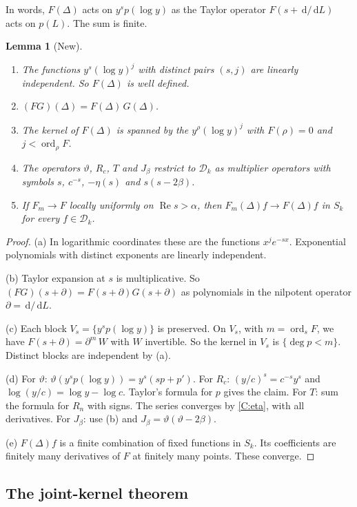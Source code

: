 \documentclass[12pt,letterpaper]{article}
\newtheorem{lemma}[theorem]{Lemma}
\theoremstyle{definition}
\theoremstyle{remark}
\newcommand{\Ree}{\operatorname{Re}}
\newcommand{\dd}{\,\mathrm{d}}
\newcommand{\Dk}{\mathcal{D}_k}
\newcommand{\ord}{\operatorname{ord}}
\newcommand{\yD}{\vartheta}
\begin{document}
In words, $F(\Delta)$ acts on $y^s p(\log y)$ as the Taylor operator
$F(s+\dd/\dd L)$ acts on $p(L)$. The sum is finite.

\begin{lemma}[New]\label{lem:multiplier}
\begin{enumerate}[label=(\alph*)]
\item The functions $y^s(\log y)^j$ with distinct pairs $(s,j)$ are
  linearly independent. So $F(\Delta)$ is well defined.
\item $(FG)(\Delta)=F(\Delta)\,G(\Delta)$.
\item The kernel of $F(\Delta)$ is spanned by the $y^\rho(\log y)^j$ with
  $F(\rho)=0$ and $j<\ord_\rho F$.
\item The operators $\yD$, $R_c$, $T$ and $J_\beta$ restrict to $\Dk$ as
  multiplier operators with symbols $s$, $c^{-s}$, $-\eta(s)$ and
  $s(s-2\beta)$.
\item If $F_m\to F$ locally uniformly on $\Ree s>\alpha$, then
  $F_m(\Delta)f\to F(\Delta)f$ in $S_k$ for every $f\in\Dk$.
\end{enumerate}
\end{lemma}

\begin{proof}
(a) In logarithmic coordinates these are the functions $x^je^{-sx}$.
Exponential polynomials with distinct exponents are linearly independent.

(b) Taylor expansion at $s$ is multiplicative. So
$(FG)(s+\partial)=F(s+\partial)G(s+\partial)$ as polynomials in the
nilpotent operator $\partial=\dd/\dd L$.

(c) Each block $V_s=\{y^sp(\log y)\}$ is preserved. On $V_s$, with
$m=\ord_sF$, we have $F(s+\partial)=\partial^m\,W$ with $W$ invertible.
So the kernel in $V_s$ is $\{\deg p<m\}$. Distinct blocks are independent
by (a).

(d) For $\yD$: $\yD(y^sp(\log y))=y^s(sp+p')$. For $R_c$:
$(y/c)^s=c^{-s}y^s$ and $\log(y/c)=\log y-\log c$. Taylor's formula for
$p$ gives the claim. For $T$: sum the formula for $R_n$ with signs. The
series converges by \ref{C:eta}, with all derivatives. For $J_\beta$: use
(b) and $J_\beta=\yD(\yD-2\beta)$.

(e) $F(\Delta)f$ is a finite combination of fixed functions in $S_k$. Its
coefficients are finitely many derivatives of $F$ at finitely many
points. These converge.
\end{proof}

\subsection{The joint-kernel theorem}
\end{document}
